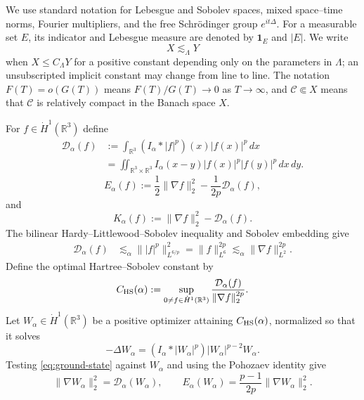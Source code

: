 \documentclass[preprint,12pt]{elsarticle}
\numberwithin{equation}{section}
\theoremstyle{remark}
\newcommand{\R}{\mathbb R}
\newcommand{\dd}{\,d}
\newcommand{\Dcal}{\mathcal D_{\alpha}}
\newcommand{\Ecal}{E_{\alpha}}
\newcommand{\Kcal}{K_{\alpha}}
\newcommand{\one}{\mathbf 1}
\begin{document}
We use standard notation for Lebesgue and Sobolev spaces, mixed space--time norms, Fourier multipliers, and the free Schr\"odinger group $e^{it\Delta}$.  For a measurable set $E$, its indicator and Lebesgue measure are denoted by $\one_E$ and $|E|$.  We write
\[
  X\lesssim_{\Lambda}Y
\]
when $X\le C_{\Lambda}Y$ for a positive constant depending only on the parameters in $\Lambda$; an unsubscripted implicit constant may change from line to line.  The notation $F(T)=o(G(T))$ means $F(T)/G(T)\to0$ as $T\to\infty$, and $\mathcal C\Subset X$ means that $\mathcal C$ is relatively compact in the Banach space $X$.

For $f\in\dot H^1(\R^3)$ define
\begin{align*}
  \Dcal(f)
  &:=\int_{\R^3}(I_\alpha*|f|^p)(x)|f(x)|^p\dd x\\
  &=\iint_{\R^3\times\R^3}
  I_\alpha(x-y)|f(x)|^p|f(y)|^p\dd x\dd y.
\end{align*}
\begin{equation}\label{eq:energy}
  \Ecal(f):=\frac12\|\nabla f\|_2^2-\frac1{2p}\Dcal(f),
\end{equation}
and
\begin{equation}\label{eq:Kalpha}
  \Kcal(f):=\|\nabla f\|_2^2-\Dcal(f).
\end{equation}
The bilinear Hardy--Littlewood--Sobolev inequality and Sobolev embedding give
\begin{align}
  \Dcal(f)
  &\lesssim_\alpha
  \bigl\||f|^p\bigr\|_{L^{6/p}}^2
  =\|f\|_{L^6}^{2p}
  \lesssim_\alpha\|\nabla f\|_{L^2}^{2p}.
  \label{eq:D-finite}
\end{align}
Define the optimal Hartree--Sobolev constant by
\begin{equation*}
  C_{\rm HS}(\alpha)
  :=\sup_{0\ne f\in\dot H^1(\R^3)}
  \frac{\Dcal(f)}{\|\nabla f\|_2^{2p}}.
\end{equation*}
Let $W_\alpha\in\dot H^1(\R^3)$ be a positive optimizer attaining $C_{\rm HS}(\alpha)$, normalized so that it solves
\begin{equation}\label{eq:ground-state}
  -\Delta W_\alpha
  =(I_\alpha*|W_\alpha|^p)|W_\alpha|^{p-2}W_\alpha.
\end{equation}
Testing \eqref{eq:ground-state} against $W_\alpha$ and using the Pohozaev identity give
\begin{equation}\label{eq:ground-pohozaev}
  \|\nabla W_\alpha\|_2^2=\Dcal(W_\alpha),
  \qquad
  \Ecal(W_\alpha)=\frac{p-1}{2p}\|\nabla W_\alpha\|_2^2.
\end{equation}
\end{document}
